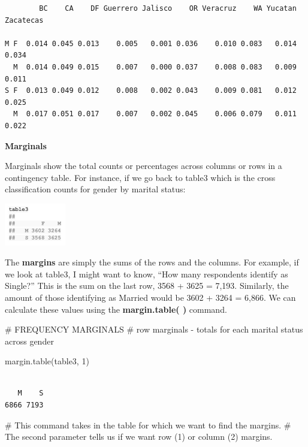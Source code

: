 \documentclass[
  letterpaper,
  DIV=11,
  numbers=noendperiod]{scrreprt}
\newenvironment{Shaded}{\begin{snugshade}}{\end{snugshade}}
\newcommand{\CommentTok}[1]{\textcolor[rgb]{0.37,0.37,0.37}{#1}}
\newcommand{\DecValTok}[1]{\textcolor[rgb]{0.68,0.00,0.00}{#1}}
\newcommand{\FunctionTok}[1]{\textcolor[rgb]{0.28,0.35,0.67}{#1}}
\newcommand{\NormalTok}[1]{\textcolor[rgb]{0.00,0.23,0.31}{#1}}
\begin{document}
\begin{verbatim}
        BC    CA    DF Guerrero Jalisco    OR Veracruz    WA Yucatan Zacatecas
                                                                              
M F  0.014 0.045 0.013    0.005   0.001 0.036    0.010 0.083   0.014     0.034
  M  0.014 0.049 0.015    0.007   0.000 0.037    0.008 0.083   0.009     0.011
S F  0.013 0.049 0.012    0.008   0.002 0.043    0.009 0.081   0.012     0.025
  M  0.017 0.051 0.017    0.007   0.002 0.045    0.006 0.079   0.011     0.022
\end{verbatim}

\textbf{Marginals}

Marginals show the total counts or percentages across columns or rows in
a contingency table. For instance, if we go back to table3 which is the
cross classification counts for gender by marital status:

\includegraphics[width=0.2\textwidth,height=\textheight]{./images/Daily-6-Pic-2.jpg}

The \textbf{margins} are simply the sums of the rows and the columns.
For example, if we look at table3, I might want to know, ``How many
respondents identify as Single?'' This is the sum on the last row, 3568
+ 3625 = 7,193. Similarly, the amount of those identifying as Married
would be 3602 + 3264 = 6,866. We can calculate these values using the
\textbf{margin.table( )} command.

\begin{Shaded}
\begin{Highlighting}[]
\CommentTok{\# FREQUENCY MARGINALS}
\CommentTok{\# row marginals {-} totals for each marital status across gender}

\FunctionTok{margin.table}\NormalTok{(table3, }\DecValTok{1}\NormalTok{)}
\end{Highlighting}
\end{Shaded}

\begin{verbatim}

   M    S 
6866 7193 
\end{verbatim}

\begin{Shaded}
\begin{Highlighting}[]
\CommentTok{\# This command takes in the table for which we want to find the margins.}
\CommentTok{\# The second parameter tells us if we want row (1) or column (2) margins.}
\end{Highlighting}
\end{Shaded}
\end{document}
